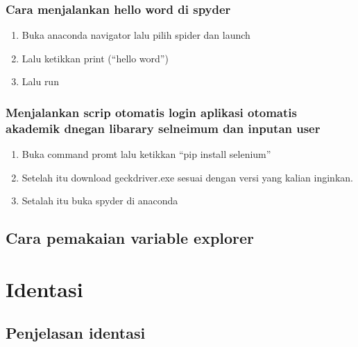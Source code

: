 \documentclass{article}
\begin{document}
\begin{enumerate}
\subsubsection{Cara menjalankan hello word di spyder}
\begin{enumerate}
\item	Buka anaconda navigator lalu pilih spider dan launch
\item	Lalu ketikkan print (“hello word”)
\item	Lalu run
\end{enumerate}
\subsubsection{Menjalankan scrip otomatis login aplikasi otomatis akademik dnegan libarary selneimum dan inputan user}
\begin{enumerate}
    \item 	Buka command promt lalu ketikkan “pip install selenium”
\item	 Setelah itu download geckdriver.exe sesuai dengan versi  yang kalian inginkan.
\item	 Setalah itu buka spyder di anaconda 
\usepackage{
Form Selenium Import Webdriver
Form Selenium.Webdriver.Firefox.Option Import Options
Opsi=Option()
Opsi=Webdriver.Firefox.Options.Options()
Opsi.Headless = False
Binary = Webdriver.Firefox.Firefox_Binary.Firefoxbinary(“C:\Programfiles(X86)\Mozilla Firefoxfirefox
Cap = Webdriver.Common.Desired_Capabilities.Desiredcapabilities().Firefox
Cap[‘Marionette’] = TRUE
Driver = Webdriver.Firefox()
Driver.Get(“Https:\\Siap.Poltekpos.Ac.Id”)
Driver.Find_Element_By_Name(‘User_Name).Send_Keys(“1184006”)
Driver.Find_Element_By_Name(‘Password’).Send_Keys(“Sariasih54”)
Driver.Find_Element_By_Xpath()
}


\end{enumerate}


\subsection{Cara pemakaian variable explorer}
\usepackage{File yang kamu masukkan akan di tampilkan pada explorer variable maka nama,tipe data dan nilai akan keluar di variable explorer
}
\section{Identasi}
\subsection{	Penjelasan identasi}
\usepackage{Berasal dari kata identation yang artinya adalah menjorok masuk ke dalam yang digunakan untuk memisahkan  mana bagian milik IF,dan mana bagian else. Karena itu python mengharuskan adanya identasi.}

\end{enumerate}
\end{document}
